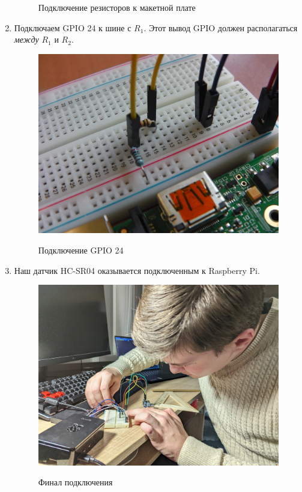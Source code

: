 \documentclass[a4paper, 14pt]{article}
\begin{document}
\begin{enumerate}
\begin{figure}[H]
		      \caption{Подключение резисторов к макетной плате}
	      \end{figure}
	\item Подключаем GPIO 24 к шине с $R_1$. Этот вывод GPIO должен располагаться \textit{между} $R_1$ и $R_2$.
	      \begin{figure}[H]
		      \centering
		      \includegraphics[width=14cm]{screenshots/10.png}\\
		      \caption{Подключение GPIO 24}
	      \end{figure}
	\item Наш датчик HC-SR04 оказывается подключенным к Raspberry Pi.
	      \begin{figure}[H]
		      \centering
		      \includegraphics[width=14cm]{screenshots/11.png}\\
		      \caption{Финал подключения}
	      \end{figure}
\end{enumerate}
\end{document}
